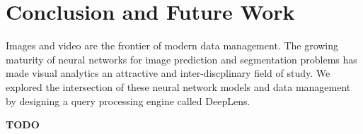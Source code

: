 \section{Conclusion and Future Work}
Images and video are the frontier of modern data management.
The growing maturity of neural networks for image prediction and segmentation problems has made visual analytics an attractive and inter-discplinary field of study.
We explored the intersection of these neural network models and data management by designing a query processing engine called \textsf{DeepLens}.

\textbf{TODO}